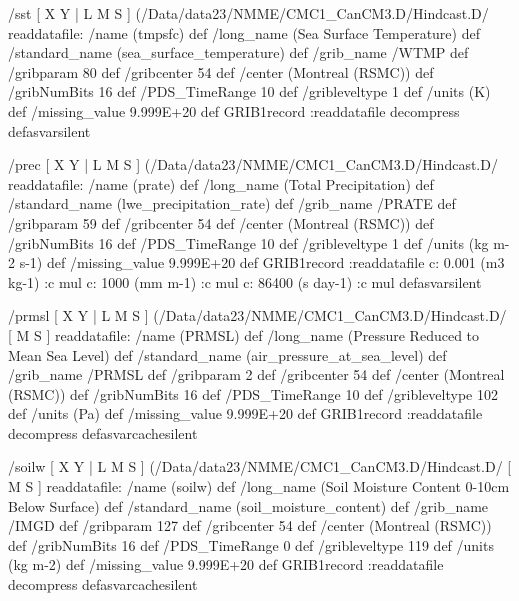 \begin{ingrid}
/sst {
[ X Y | L M S ] (/Data/data23/NMME/CMC1_CanCM3.D/Hindcast.D/%
readdatafile: 
/name (tmpsfc) def
/long_name (Sea Surface Temperature) def
/standard_name (sea_surface_temperature) def
/grib_name /WTMP def
/gribparam 80 def
/gribcenter 54 def
/center (Montreal (RSMC)) def
/gribNumBits 16 def
/PDS_TimeRange 10 def
/gribleveltype 1 def
/units (K) def
/missing_value 9.999E+20 def
GRIB1record
:readdatafile decompress
} defasvarsilent

/prec {
[ X Y | L M S ] (/Data/data23/NMME/CMC1_CanCM3.D/Hindcast.D/%
readdatafile: 
/name (prate) def
/long_name (Total Precipitation) def
/standard_name (lwe_precipitation_rate) def
/grib_name /PRATE def
/gribparam 59 def
/gribcenter 54 def
/center (Montreal (RSMC)) def
/gribNumBits 16 def
/PDS_TimeRange 10 def
/gribleveltype 1 def
/units (kg m-2 s-1) def
/missing_value 9.999E+20 def
GRIB1record
:readdatafile
  c:
   0.001 (m3 kg-1) :c
   mul
  c:
   1000 (mm m-1) :c
   mul
  c:
   86400 (s day-1) :c
   mul
} defasvarsilent

/prmsl {
[ X Y | L M S ] (/Data/data23/NMME/CMC1_CanCM3.D/Hindcast.D/%
[ M S ]
readdatafile: 
/name (PRMSL) def
/long_name (Pressure Reduced to Mean Sea Level) def
/standard_name (air_pressure_at_sea_level) def
/grib_name /PRMSL def
/gribparam 2 def
/gribcenter 54 def
/center (Montreal (RSMC)) def
/gribNumBits 16 def
/PDS_TimeRange 10 def
/gribleveltype 102 def
/units (Pa) def
/missing_value 9.999E+20 def
GRIB1record
:readdatafile decompress
} defasvarcachesilent

/soilw {
[ X Y | L M S ]
(/Data/data23/NMME/CMC1_CanCM3.D/Hindcast.D/%
[ M S ]
readdatafile: 
/name (soilw) def
/long_name (Soil Moisture Content 0-10cm Below Surface) def
/standard_name (soil_moisture_content) def
/grib_name /IMGD def
/gribparam 127 def
/gribcenter 54 def
/center (Montreal (RSMC)) def
/gribNumBits 16 def
/PDS_TimeRange 0 def
/gribleveltype 119 def
/units (kg m-2) def
/missing_value 9.999E+20 def
GRIB1record
:readdatafile decompress
} defasvarcachesilent


\end{ingrid}
